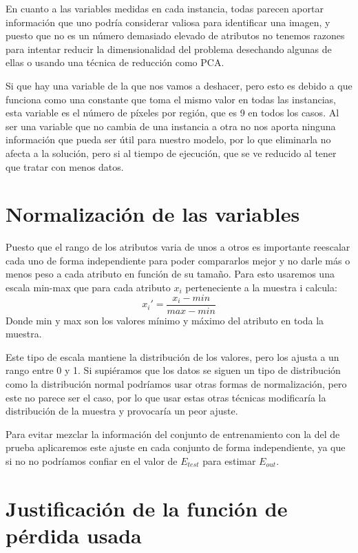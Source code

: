 \documentclass{article}
\begin{document}
	En cuanto a las variables medidas en cada instancia, todas parecen aportar información que uno podría considerar valiosa para identificar una imagen, y puesto que no es un número demasiado elevado de atributos no tenemos razones para intentar reducir la dimensionalidad del problema desechando algunas de ellas o usando una técnica de reducción como PCA.
	\par 
	Si que hay una variable de la que nos vamos a deshacer, pero esto es debido a que funciona como una constante que toma el mismo valor en todas las instancias, esta variable es el número de píxeles por región, que es 9 en todos los casos. Al ser una variable que no cambia de una instancia a otra no nos aporta ninguna información que pueda ser útil para nuestro modelo, por lo que eliminarla no afecta a la solución, pero si al tiempo de ejecución, que se ve reducido al tener que tratar con menos datos.
	
	\section{Normalización de las variables} %
	
	Puesto que el rango de los atributos varia de unos a otros es importante reescalar cada uno de forma independiente para poder compararlos mejor y no darle más o menos peso a cada atributo en función de su tamaño. Para esto usaremos una escala min-max que para cada atributo $x_i$ perteneciente a la muestra i calcula:
	\begin{equation}
	x_i' = \frac{x_i-min}{max-min}
	\end{equation}
	\indent Donde min y max son los valores mínimo y máximo del atributo en toda la muestra.
	\par 
	Este tipo de escala mantiene la distribución de los valores, pero los ajusta a un rango entre 0 y 1.  Si supiéramos que los datos se siguen un tipo de distribución como la distribución normal podríamos usar otras formas de normalización, pero este no parece ser el caso, por lo que usar estas otras técnicas modificaría la distribución de la muestra y provocaría un peor ajuste.
	\par 
	Para evitar mezclar la información del conjunto de entrenamiento con la del de prueba aplicaremos este ajuste en cada conjunto de forma independiente, ya que si no no podríamos confiar en el valor de $E_{test}$ para estimar $E_{out}$.
	
	\section{Justificación de la función de pérdida usada}
	
\end{document}
